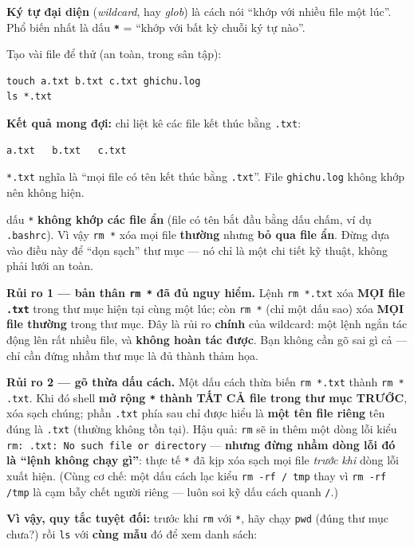 \documentclass[12pt,a4paper]{article}
\newcommand{\cmd}[1]{\texttt{#1}}
\begin{document}
\textbf{Ký tự đại diện} (\textit{wildcard}, hay \textit{glob}) là cách nói ``khớp với nhiều file một lúc''. Phổ biến nhất là dấu \textbf{\cmd{*}} = ``khớp với bất kỳ chuỗi ký tự nào''.

Tạo vài file để thử (an toàn, trong sân tập):

\begin{Verbatim}
touch a.txt b.txt c.txt ghichu.log
ls *.txt
\end{Verbatim}

\textbf{Kết quả mong đợi:} chỉ liệt kê các file kết thúc bằng \cmd{.txt}:
\begin{Verbatim}
a.txt   b.txt   c.txt
\end{Verbatim}

\cmd{*.txt} nghĩa là ``mọi file có tên kết thúc bằng \cmd{.txt}''. File \cmd{ghichu.log} không khớp nên không hiện.

\begin{notebox}[title={Một điểm quan trọng cần biết về \texttt{*}}]
dấu \cmd{*} \textbf{không khớp các file ẩn} (file có tên bắt đầu bằng dấu chấm, ví dụ \cmd{.bashrc}). Vì vậy \cmd{rm *} xóa mọi file \textbf{thường} nhưng \textbf{bỏ qua file ẩn}. Đừng dựa vào điều này để ``dọn sạch'' thư mục --- nó chỉ là một chi tiết kỹ thuật, không phải lưới an toàn.
\end{notebox}

\begin{dangerbox}[title={Cạm bẫy \texttt{*} + \texttt{rm} --- hai rủi ro tách bạch}]
\textbf{Rủi ro 1 --- bản thân \cmd{rm *} đã đủ nguy hiểm.} Lệnh \cmd{rm *.txt} xóa \textbf{MỌI file \cmd{.txt}} trong thư mục hiện tại cùng một lúc; còn \cmd{rm *} (chỉ một dấu sao) xóa \textbf{MỌI file thường} trong thư mục. Đây là rủi ro \textbf{chính} của wildcard: một lệnh ngắn tác động lên rất nhiều file, và \textbf{không hoàn tác được}. Bạn không cần gõ sai gì cả --- chỉ cần đứng nhầm thư mục là đủ thành thảm họa.

\vspace{0.6em}
\textbf{Rủi ro 2 --- gõ thừa dấu cách.} Một dấu cách thừa biến \cmd{rm *.txt} thành \cmd{rm * .txt}. Khi đó shell \textbf{mở rộng \cmd{*} thành TẤT CẢ file trong thư mục TRƯỚC}, xóa sạch chúng; phần \cmd{.txt} phía sau chỉ được hiểu là \textbf{một tên file riêng} tên đúng là \cmd{.txt} (thường không tồn tại). Hậu quả: \cmd{rm} sẽ in thêm một dòng lỗi kiểu \cmd{rm: .txt: No such file or directory} --- \textbf{nhưng đừng nhầm dòng lỗi đó là ``lệnh không chạy gì''}: thực tế \cmd{*} đã kịp xóa sạch mọi file \textit{trước khi} dòng lỗi xuất hiện. (Cùng cơ chế: một dấu cách lạc kiểu \cmd{rm -rf / tmp} thay vì \cmd{rm -rf /tmp} là cạm bẫy chết người riêng --- luôn soi kỹ dấu cách quanh \cmd{/}.)

\vspace{0.6em}
\textbf{Vì vậy, quy tắc tuyệt đối:} trước khi \cmd{rm} với \cmd{*}, hãy chạy \cmd{pwd} (đúng thư mục chưa?) rồi \cmd{ls} với \textbf{cùng mẫu} đó để xem danh sách:
\end{dangerbox}
\end{document}

